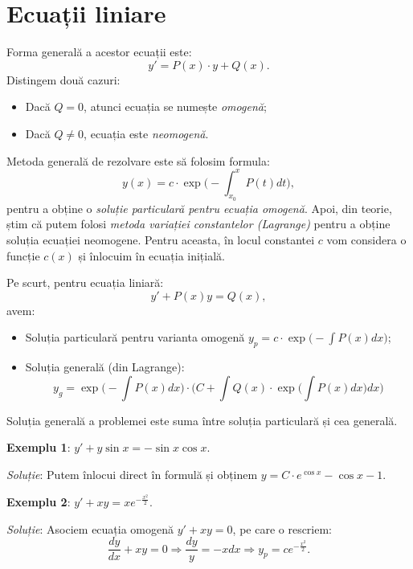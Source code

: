 
\section{Ecuații liniare}
\label{sec:lin}

Forma generală a acestor ecuații este:
\[
  y' = P(x) \cdot y + Q(x).
\]
Distingem două cazuri:
\begin{itemize}
\item Dacă $Q = 0$, atunci ecuația se numește \emph{omogenă};
\item Dacă $Q \neq 0$, ecuația este \emph{neomogenă}.
\end{itemize}

Metoda generală de rezolvare este să folosim formula:
\[
  y(x) = c \cdot \exp \Big( -\int_{x_0}^x P(t) dt \Big),
\]
pentru a obține o \emph{soluție particulară pentru ecuația omogenă}. Apoi, din teorie,
știm că putem folosi \emph{metoda variației constantelor (Lagrange)} pentru a obține
soluția ecuației neomogene. Pentru aceasta, în locul constantei $c$ vom considera
o funcție $c(x)$ și înlocuim în ecuația inițială.

Pe scurt, pentru ecuația liniară:
\[
  y' + P(x) y = Q(x),
\]
avem:
\begin{itemize}
  \item Soluția particulară pentru varianta omogenă $y_p = c \cdot \exp\Big( -\int P(x) dx \Big)$;
  \item Soluția generală (din Lagrange):
    \[
      y_g = \exp\Big(-\int P(x) dx\Big) \cdot \Big( C + \int Q(x) \cdot \exp\Big( \int P(x) dx \Big) dx \Big)
    \]
\end{itemize}

Soluția generală a problemei este suma între soluția particulară și cea generală.


\textbf{Exemplu 1}: $y' + y \sin x = -\sin x \cos x$.

\emph{Soluție}: Putem înlocui direct în formulă și obținem $y = C \cdot e^{\cos x} - \cos x - 1$.

\vspace{1cm}

\textbf{Exemplu 2}: $y' + xy = x e^{-\frac{x^2}{2}}$.

\emph{Soluție}: Asociem ecuația omogenă $y' + xy = 0$, pe care o rescriem:
\[
  \frac{dy}{dx} + xy = 0 \Rightarrow \frac{dy}{y} = -xdx \Rightarrow y_p = ce^{-\frac{x^2}{2}}.
\]

